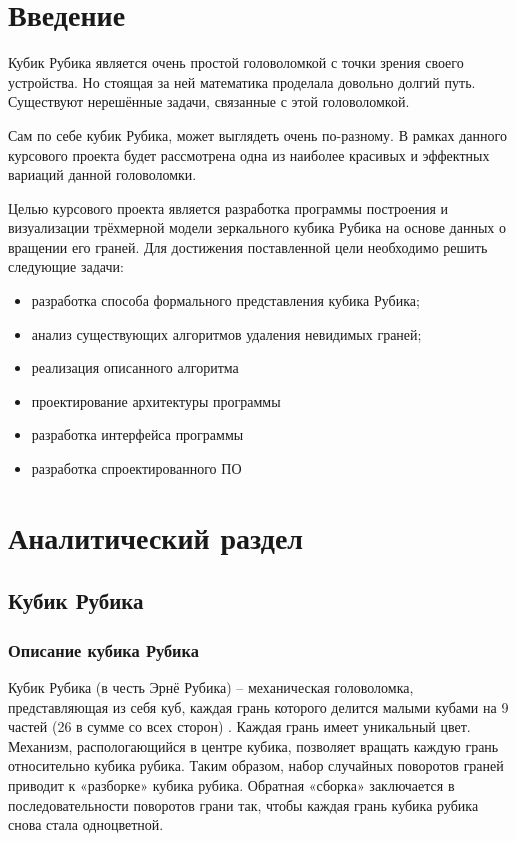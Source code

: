 \documentclass[a4paper, 14pt]{report}
\begin{document}
	\tableofcontents %
	\chapter{Введение}
	Кубик Рубика является очень простой головоломкой с точки зрения своего устройства. Но стоящая за ней математика проделала довольно долгий путь. Существуют нерешённые задачи, связанные с этой головоломкой.
	
	Сам по себе кубик Рубика, может выглядеть очень по-разному. В рамках данного курсового проекта будет рассмотрена одна из наиболее красивых и эффектных вариаций данной головоломки. 
	
	Целью курсового проекта является разработка программы построения и визуализации трёхмерной модели зеркального кубика Рубика на основе данных о вращении его граней. Для достижения поставленной цели необходимо решить следующие задачи:
	\begin{itemize}
		\item разработка способа формального представления кубика Рубика;
		\item анализ существующих алгоритмов удаления невидимых граней;
		\item реализация описанного алгоритма
		\item проектирование архитектуры программы
		\item разработка интерфейса программы
		\item разработка спроектированного ПО
	\end{itemize}

	\chapter{Аналитический раздел}
	\section{Кубик Рубика}
	\subsection{Описание кубика Рубика}
	Кубик Рубика (в честь Эрнё Рубика) – механическая головоломка, представляющая из себя куб, каждая грань которого делится малыми кубами на 9 частей (26 в сумме со всех сторон) \cite{how_to_assemble}. Каждая грань имеет уникальный цвет. Механизм, распологающийся в центре кубика, позволяет вращать каждую грань относительно кубика рубика. Таким образом, набор случайных поворотов граней приводит к «разборке» кубика рубика. Обратная «сборка» заключается в последовательности поворотов грани так, чтобы каждая грань кубика рубика снова стала одноцветной.
	
\end{document}
